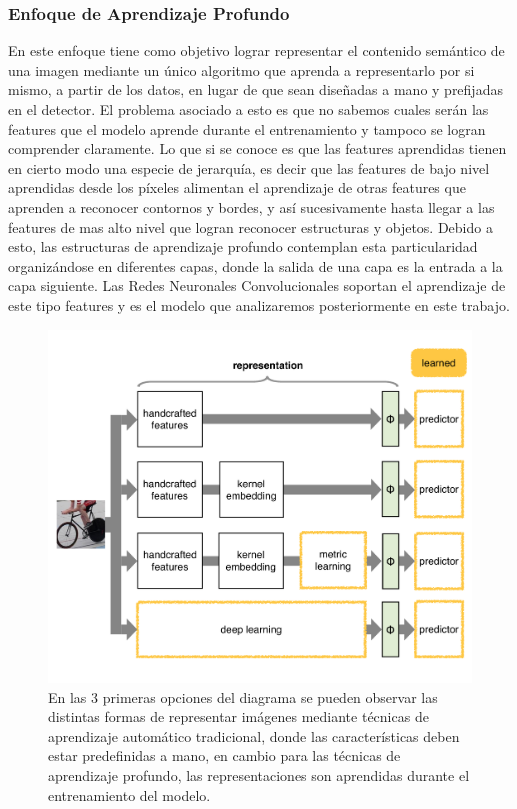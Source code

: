 \documentclass[a4paper,11pt,spanish]{book}
\begin{document}
      \subsubsection{Enfoque de Aprendizaje Profundo}
	En este enfoque tiene como objetivo lograr representar el contenido semántico de una imagen mediante un único algoritmo que aprenda a representarlo por si mismo,
	a partir de los datos, 	en lugar de que sean diseñadas a mano y prefijadas en el detector.
	El problema asociado a esto es que no sabemos cuales serán las features que el modelo aprende durante el entrenamiento y tampoco se logran comprender claramente.
	Lo que si se conoce es que las features aprendidas tienen en cierto modo una especie de jerarquía, es decir que las features de bajo nivel aprendidas desde los píxeles
	alimentan el aprendizaje de otras features que aprenden a reconocer contornos y bordes, y así sucesivamente hasta llegar a las features de mas alto nivel que logran reconocer
	estructuras y objetos. Debido a esto, las estructuras de aprendizaje profundo contemplan esta particularidad organizándose en diferentes capas, donde la salida de una capa
	es la entrada a la capa siguiente. Las Redes Neuronales Convolucionales soportan el aprendizaje de este tipo features y es el modelo que analizaremos posteriormente en este trabajo.\\
	\begin{figure}[h!]
	  \begin{center}
		  \includegraphics[width=0.9\linewidth]{./img/vedaldi_shallow_deep.pdf}
	  \caption{En las 3 primeras opciones del diagrama se pueden observar las distintas formas de representar imágenes mediante técnicas de aprendizaje automático tradicional,
	  donde las características deben estar predefinidas a mano, en cambio para las técnicas de aprendizaje profundo, las representaciones son aprendidas durante el entrenamiento
	  del modelo.}
	  \label{fig:shallow_deep}
	  \end{center}
	\end{figure}
\end{document}
